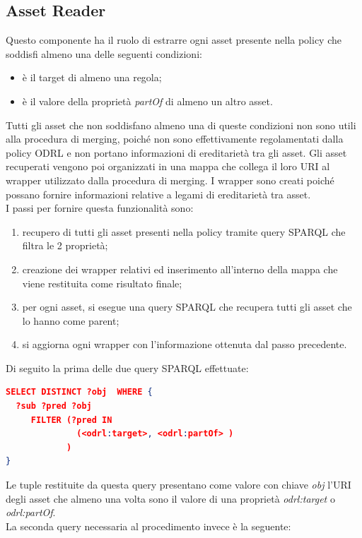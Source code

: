 \documentclass[12pt,a4paper,twoside]{book}
\begin{document}
\subsection{Asset Reader}
Questo componente ha il ruolo di estrarre ogni asset presente nella policy che soddisfi almeno una delle seguenti condizioni:
\begin{itemize}
\item è il target di almeno una regola;
\item è il valore della proprietà \textit{partOf} di almeno un altro asset.
\end{itemize}
Tutti gli asset che non soddisfano almeno una di queste condizioni non sono utili alla procedura di merging, poiché non sono effettivamente regolamentati dalla policy ODRL e non portano informazioni di ereditarietà tra gli asset. Gli asset recuperati vengono poi organizzati in una mappa che collega il loro URI al wrapper utilizzato dalla procedura di merging. I wrapper sono creati poiché possano fornire informazioni relative a legami di ereditarietà tra asset.\\
I passi per fornire questa funzionalità sono:
\begin{enumerate}
\item recupero di tutti gli asset presenti nella policy tramite query SPARQL che filtra le 2 proprietà;
\item creazione dei wrapper relativi ed inserimento all'interno della mappa che viene restituita come risultato finale;
\item per ogni asset, si esegue una query SPARQL che recupera tutti gli asset che lo hanno come parent;
\item si aggiorna ogni wrapper con l'informazione ottenuta dal passo precedente. 
\end{enumerate}
Di seguito la prima delle due query SPARQL effettuate:
\begin{lstlisting}[language=json,firstnumber=1,caption={Query SPARQL per il recupero degli asset utili alla procedura di merging},captionpos=b,label=parserRuleCode]
SELECT DISTINCT ?obj  WHERE {
  ?sub ?pred ?obj
     FILTER (?pred IN
              (<odrl:target>, <odrl:partOf> )
            ) 
}
\end{lstlisting}
Le tuple restituite da questa query presentano come valore con chiave \textit{obj} l'URI degli asset che almeno una volta sono il valore di una proprietà \textit{odrl:target} o \textit{odrl:partOf}.\\
La seconda query necessaria al procedimento invece è la seguente:
\end{document}
